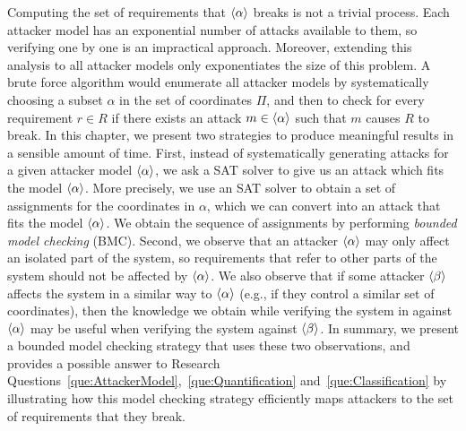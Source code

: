 Computing the set of requirements that ${{\left<\alpha\right>}}$ breaks is not a trivial process. Each attacker model has an exponential number of attacks available to them, so verifying one by one is an impractical approach. Moreover, extending this analysis to all attacker models only exponentiates the size of this problem. 
A brute force algorithm would enumerate all attacker models by systematically choosing a subset $\alpha$ in the set of coordinates $\Pi$, and then to check for every requirement $r\in {R}$ if there exists an attack $m\in {{\left<\alpha\right>}}$ such that $m$ causes $R$ to break. %
In this chapter, we present two strategies to produce meaningful results in a sensible amount of time. First, instead of systematically generating attacks for a given attacker model ${{\left<\alpha\right>}}$, we ask a SAT solver to give us an attack which fits the model ${{\left<\alpha\right>}}$. More precisely, we use an SAT solver to obtain a set of assignments for the coordinates in $\alpha$, which we can convert into an attack that fits the model ${{\left<\alpha\right>}}$. 
We obtain the sequence of assignments by performing \emph{bounded model checking} (BMC). Second, we observe that an attacker ${{\left<\alpha\right>}}$ may only affect an isolated part of the system, so requirements that refer to other parts of the system should not be affected by ${{\left<\alpha\right>}}$. We also observe that if some attacker ${{\left<\beta\right>}}$ affects the system in a similar way to ${{\left<\alpha\right>}}$ (e.g., if they control a similar set of coordinates), then the knowledge we obtain while verifying the system in against ${{\left<\alpha\right>}}$ may be useful when verifying the system against ${{\left<\beta\right>}}$. In summary, we present a bounded model checking strategy that uses these two observations, and provides a possible answer to Research Questions~\ref{que:AttackerModel},~\ref{que:Quantification} and~\ref{que:Classification} by illustrating how this model checking strategy efficiently maps attackers to the set of requirements that they break.




